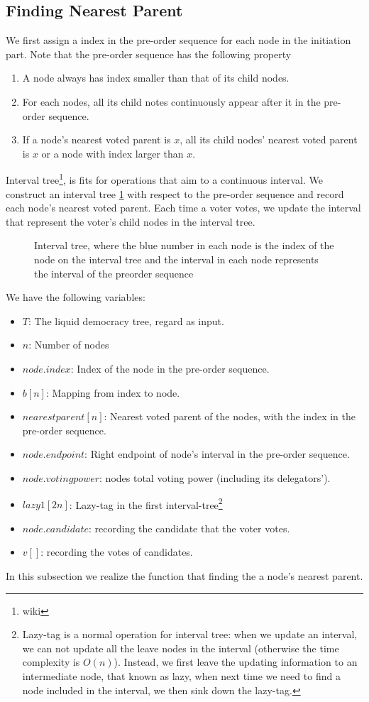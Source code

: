 \subsection{Finding Nearest Parent}
We first assign a index in the pre-order sequence for each node in the initiation part. Note that the pre-order sequence has the following property
\begin{enumerate}
	\item A node always has index smaller than that of its child nodes.
    \item For each nodes, all its child notes continuously appear after it in the pre-order sequence.
	\item If a node's nearest voted parent is $x$, all its child nodes' nearest voted parent is $x$ or a node with index larger than $x$.
\end{enumerate}
Interval tree\footnote{wiki}, is fits for operations that aim to a continuous interval. We construct an interval tree \ref{fig:3} with respect to the pre-order sequence and record each node's nearest voted parent. Each time a voter votes, we update the interval that represent the voter's child nodes in the interval tree.

\begin{figure}
	\centering
	\label{fig:3}
	
	\caption{Interval tree, where the blue number in each node is the index of the node on the interval tree and the interval in each node represents the interval of the preorder sequence}
\end{figure}

We have the following variables:
\begin{itemize}
	\item $T$: The liquid democracy tree, regard as input.
	\item $n$: Number of nodes
	\item $node.index$: Index of the node in the pre-order sequence.
	\item $b[n]$: Mapping from index to node.
	\item $nearestparent[n]$: Nearest voted parent of the nodes, with the index in the pre-order sequence.
	\item $node.endpoint$: Right endpoint of node's interval in the pre-order sequence.
	\item $node.votingpower$: nodes total voting power (including its delegators').
	\item $lazy1[2n]$: Lazy-tag in the first interval-tree\footnote{Lazy-tag is a normal operation for interval tree: when we update an interval, we can not update all the leave nodes in the interval (otherwise the time complexity is $O(n)$). Instead, we first leave the updating information to an intermediate node, that known as lazy, when next time we need to find a node included in the interval, we then sink down the lazy-tag. }
	\item $node.candidate$: recording the candidate that the voter votes.
	\item $v[]$: recording the votes of candidates.
\end{itemize}
In this subsection we realize the function that finding the a node's nearest parent.

